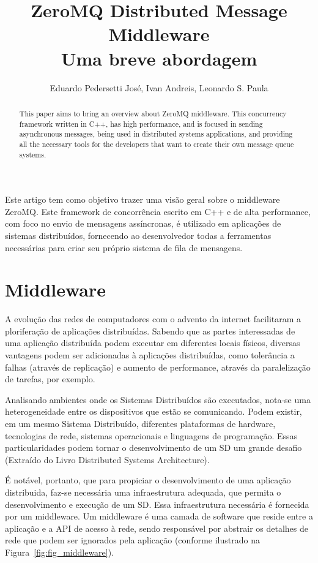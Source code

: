\documentclass[12pt]{article}
\title{ZeroMQ Distributed Message Middleware\\Uma breve abordagem}
\author{Eduardo Pedersetti José\inst{1}, Ivan Andreis\inst{1}, Leonardo S. Paula\inst{1}}
\begin{document}
 

\maketitle

\begin{abstract}
  This paper aims to bring an overview about ZeroMQ middleware. This concurrency framework written in C++, has high performance, and is focused in sending asynchronous messages, being used in distributed systems applications, and providing all the necessary tools for the developers that want to create their own message queue systems.
\end{abstract}
     
\begin{resumo} 
   Este artigo tem como objetivo trazer uma visão geral sobre o middleware ZeroMQ. Este framework de concorrência escrito em C++ e de alta performance, com foco no envio de mensagens assíncronas, é utilizado em aplicações de sistemas distribuídos, fornecendo ao desenvolvedor todas a ferramentas necessárias para criar seu próprio sistema de fila de mensagens.
\end{resumo}

\section{Middleware}
	A evolução das redes de computadores com o advento da internet facilitaram a ploriferação de aplicações distribuídas. Sabendo que as partes interessadas de uma aplicação distribuída podem executar em diferentes locais físicos, diversas vantagens podem ser adicionadas à aplicações distribuídas, como tolerância a falhas (através de replicação) e aumento de performance, através da paralelização de tarefas, por exemplo.

	Analisando ambientes onde os Sistemas Distribuídos são executados, nota-se uma heterogeneidade entre os dispositivos que estão se comunicando. Podem existir, em um mesmo Sistema Distribuído, diferentes plataformas de hardware, tecnologias de rede, sistemas operacionais e linguagens de programação. Essas particularidades podem tornar o desenvolvimento de um SD um grande desafio  (Extraído do Livro Distributed Systems Architecture).

	É notável, portanto, que para propiciar o desenvolvimento de uma aplicação distribuida, faz-se necessária uma infraestrutura adequada, que permita o desenvolvimento e execução de um SD. Essa infraestrutura necessária é fornecida por um middleware. Um middleware é uma camada de software que reside entre a aplicação e a API de acesso à rede, sendo responsável por abstrair os detalhes de rede que podem ser ignorados pela aplicação (conforme ilustrado na Figura~\ref{fig:fig_middleware}).
\end{document}
